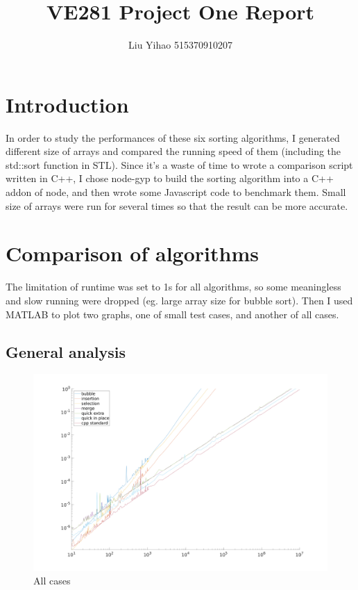 \documentclass{article}
\title{VE281 Project One Report}
\author{Liu Yihao 515370910207}
\date{}
\begin{document}
\maketitle

\section{Introduction}

In order to study the performances of these six sorting algorithms, I generated different size of arrays and compared the running speed of them (including the std::sort function in STL). Since it's a waste of time to wrote a comparison script written in C++, I chose node-gyp to build the sorting algorithm into a C++ addon of node, and then wrote some Javascript code to benchmark them. Small size of arrays were run for several times so that the result can be more accurate.

\section{Comparison of algorithms}

The limitation of runtime was set to 1s for all algorithms, so some meaningless and slow running were dropped (eg. large array size for bubble sort). Then I used MATLAB to plot two graphs, one of small test cases, and another of all cases.

\subsection{General analysis}

\begin{figure}[!htbp]
\centering
\includegraphics[width=0.8\linewidth]{../benchmark/fig1.png}
\caption{All cases}
\label{fig-1}
\end{figure}
\end{document}
